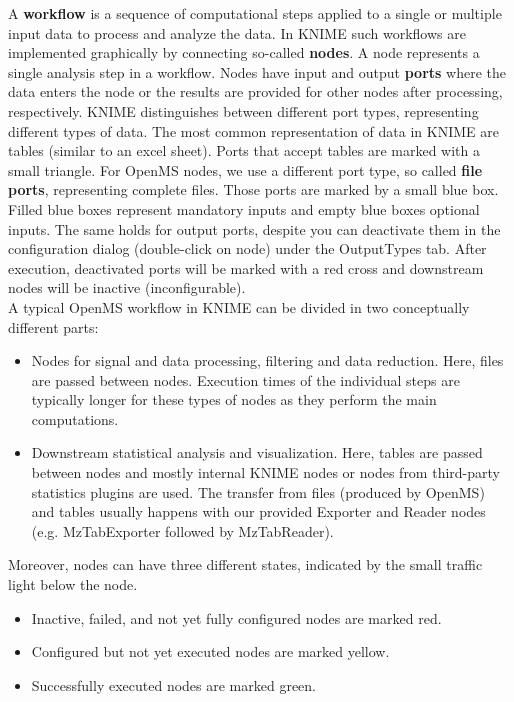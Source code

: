 A \textbf{workflow} is a sequence of computational steps applied to a single or multiple input data to process and analyze the data.
In KNIME such workflows are implemented graphically by connecting so-called \textbf{nodes}.
A node represents a single analysis step in a workflow.
Nodes have input and output \textbf{ports} where the data enters the node or the results are provided for other nodes after processing, respectively.
KNIME distinguishes between different port types, representing different types of data.
The most common representation of data in KNIME are tables (similar to an excel sheet).
Ports that accept tables are marked with a small triangle.
For OpenMS nodes, we use a different port type, so called \textbf{file ports}, representing complete files.
Those ports are marked by a small blue box.
Filled blue boxes represent mandatory inputs and empty blue boxes optional inputs. The same holds for output ports, despite you can deactivate them
in the configuration dialog (double-click on node) under the OutputTypes tab. After execution, deactivated ports will be marked with a red cross and downstream nodes
will be inactive (inconfigurable).\\
A typical OpenMS workflow in KNIME can be divided in two conceptually different parts:
\begin{itemize}
\item
Nodes for signal and data processing, filtering and data reduction. Here, files are passed between nodes. Execution times of the individual steps are typically longer for these types of nodes as they perform the main computations. 
\item
Downstream statistical analysis and visualization. Here, tables are passed between nodes and mostly internal KNIME nodes or nodes from third-party statistics plugins are used. The transfer from files (produced by OpenMS) and tables usually happens with our provided Exporter and Reader nodes (e.g. MzTabExporter followed by MzTabReader).
\end{itemize}
Moreover, nodes can have three different states, indicated by the small traffic light below the node.

\begin{itemize}
\item
Inactive, failed, and not yet fully configured nodes are marked red.
\item
Configured but not yet executed nodes are marked yellow.
\item
Successfully executed nodes are marked green.
\end{itemize}

